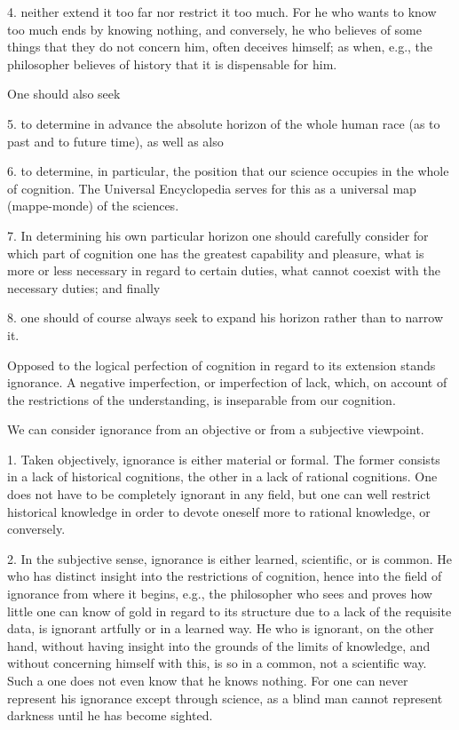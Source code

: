    4. neither extend it too far nor restrict it too much.
    For he who wants to know too much ends by knowing nothing,
    and conversely, he who believes of some things
    that they do not concern him, often deceives himself;
    as when, e.g., the philosopher believes of history
    that it is dispensable for him.

    One should also seek

    5. to determine in advance the absolute horizon of
    the whole human race (as to past and to future time),
    as well as also

    6. to determine, in particular, the position that
    our science occupies in the whole of cognition.
    The Universal Encyclopedia serves for this as
    a universal map (mappe-monde) of the sciences.

    7. In determining his own particular horizon
    one should carefully consider for which part of cognition
    one has the greatest capability and pleasure,
    what is more or less necessary in regard to certain duties,
    what cannot coexist with the necessary duties;
    and finally

    8. one should of course always seek
    to expand his horizon rather than to narrow it.

    Opposed to the logical perfection of cognition
    in regard to its extension stands ignorance.
    A negative imperfection, or imperfection of lack,
    which, on account of the restrictions of the understanding,
    is inseparable from our cognition.

    We can consider ignorance
    from an objective or from a subjective viewpoint.

    1. Taken objectively, ignorance is either material or formal.
    The former consists in a lack of historical cognitions,
    the other in a lack of rational cognitions.
    One does not have to be completely ignorant in any field,
    but one can well restrict historical knowledge in order to
    devote oneself more to rational knowledge, or conversely.

    2. In the subjective sense, ignorance is either
    learned, scientific, or is common.
    He who has distinct insight into the restrictions of cognition,
    hence into the field of ignorance from where it begins,
    e.g., the philosopher who sees and proves
    how little one can know of gold
    in regard to its structure
    due to a lack of the requisite data,
    is ignorant artfully or in a learned way.
    He who is ignorant, on the other hand,
    without having insight into
    the grounds of the limits of knowledge,
    and without concerning himself with this,
    is so in a common, not a scientific way.
    Such a one does not even know that he knows nothing.
    For one can never represent his ignorance
    except through science,
    as a blind man cannot represent darkness
    until he has become sighted.


